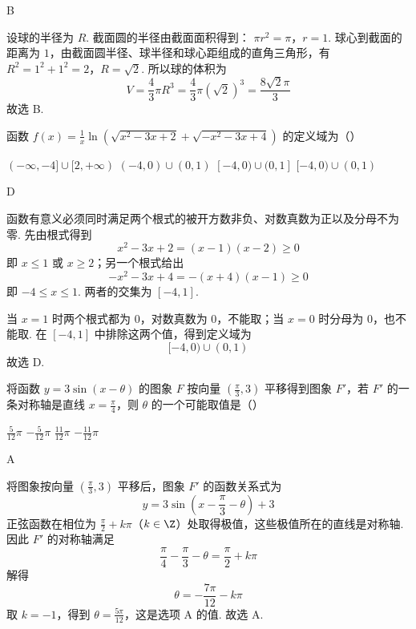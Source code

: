 \begin{answer}
B
\end{answer}

\begin{solution}
设球的半径为 \(R\). 截面圆的半径由截面面积得到：
\(\pi r^2=\pi\)，\(r=1\).
球心到截面的距离为 \(1\)，由截面圆半径、球半径和球心距组成的直角三角形，有
\(R^2=1^2+1^2=2\)，\(R=\sqrt{2}\).
所以球的体积为
\[
V=\frac{4}{3}\pi R^3=\frac{4}{3}\pi(\sqrt{2})^3=\frac{8\sqrt{2}\pi}{3}
\]
故选 B.
\end{solution}

\begin{problem}
函数 \( f(x) = \frac{1}{x} \ln \left( \sqrt{x^2 - 3x + 2} + \sqrt{-x^2 - 3x + 4} \right) \) 的定义域为（\quad）

\choices
    {\((- \infty, -4] \cup [2, +\infty)\)}
    {\((-4,0)\cup (0,1)\)}
    {\([-4,0)\cup (0,1]\)}
    {\([-4,0)\cup (0,1)\)}
\end{problem}

\begin{answer}
D
\end{answer}

\begin{solution}
函数有意义必须同时满足两个根式的被开方数非负、对数真数为正以及分母不为零. 先由根式得到
\[
x^2-3x+2=(x-1)(x-2)\geqslant0
\]
即 \(x\leqslant1\) 或 \(x\geqslant2\)；另一个根式给出
\[
-x^2-3x+4=-(x+4)(x-1)\geqslant0
\]
即 \(-4\leqslant x\leqslant1\). 两者的交集为 \([-4,1]\).

当 \(x=1\) 时两个根式都为 \(0\)，对数真数为 \(0\)，不能取；当 \(x=0\) 时分母为 \(0\)，也不能取. 在 \([-4,1]\) 中排除这两个值，得到定义域为
\[
[-4,0)\cup(0,1)
\]
故选 D.
\end{solution}

\begin{problem}
将函数 \( y = 3\sin (x - \theta) \) 的图象 \(F\) 按向量 \( \left(\frac{\pi}{3}, 3\right) \) 平移得到图象 \(F'\)，若 \(F'\) 的一条对称轴是直线 \( x = \frac{\pi}{4} \)，则 \( \theta \) 的一个可能取值是（\quad）

\choices
    {\(\frac{5}{12}\pi\)}
    {\(-\frac{5}{12}\pi\)}
    {\(\frac{11}{12}\pi\)}
    {\(-\frac{11}{12}\pi\)}
\end{problem}

\begin{answer}
A
\end{answer}

\begin{solution}
将图象按向量 \(\left(\frac{\pi}{3},3\right)\) 平移后，图象 \(F'\) 的函数关系式为
\[
y=3\sin\left(x-\frac{\pi}{3}-\theta\right)+3
\]
正弦函数在相位为 \(\frac{\pi}{2}+k\pi\)（\(k\in\Z\)）处取得极值，这些极值所在的直线是对称轴. 因此 \(F'\) 的对称轴满足
\[
\frac{\pi}{4}-\frac{\pi}{3}-\theta=\frac{\pi}{2}+k\pi
\]
解得
\[
\theta=-\frac{7\pi}{12}-k\pi
\]
取 \(k=-1\)，得到 \(\theta=\frac{5\pi}{12}\)，这是选项 A 的值.
故选 A.
\end{solution}

